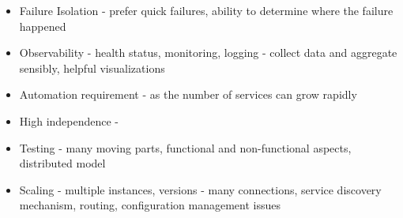 \begin{itemize}
	\item Failure Isolation - prefer quick failures, ability to determine where the failure happened
	\item Observability - health status, monitoring, logging - collect data and aggregate sensibly, helpful visualizations
	\item Automation requirement - as the number of services can grow rapidly
	\item High independence - 
	\item Testing - many moving parts, functional and non-functional aspects, distributed model
	\item Scaling - multiple instances, versions - many connections, service discovery mechanism, routing, configuration management issues
\end{itemize}


